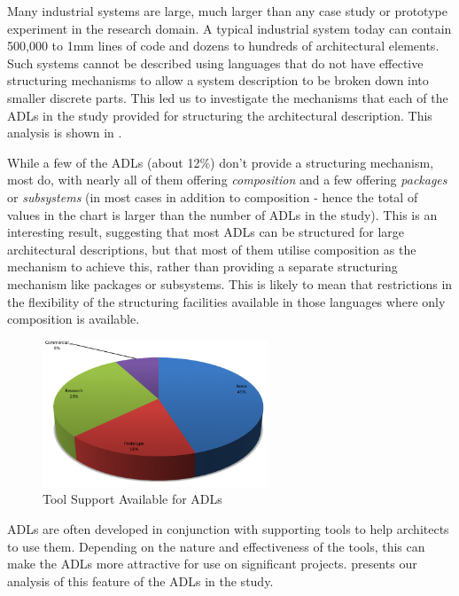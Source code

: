 Many industrial systems are large, much larger than any case study or prototype experiment in the research domain.  A typical industrial system today can contain 500,000 to 1mm lines of code and dozens to hundreds of architectural elements.  Such systems cannot be described using languages that do not have effective structuring mechanisms to allow a system description to be broken down into smaller discrete parts.  This led us to investigate the mechanisms that each of the ADLs in the study provided for structuring the architectural description.  This analysis is shown in .

While a few of the ADLs (about 12\%) don't provide a structuring mechanism, most do, with nearly all of them offering \emph{composition} and a few offering \emph{packages} or \emph{subsystems} (in most cases in addition to composition - hence the total of values in the chart is larger than the number of ADLs in the study).
This is an interesting result, suggesting that most ADLs can be structured for large architectural descriptions, but that most of them utilise composition as the mechanism to achieve this, rather than providing a separate structuring mechanism like packages or subsystems.  This is likely to mean that restrictions in the flexibility of the structuring facilities available in those languages where only composition is available.

\begin{figure}
\centering
\includegraphics[width=0.6\textwidth]{Figures/litreview-adl-toolsupport}
\caption{Tool Support Available for ADLs}
\label{figure:litreview-adl-toolsupport}
\end{figure}

ADLs are often developed in conjunction with supporting tools to help architects to use them.  Depending on the nature and effectiveness of the tools, this can make the ADLs more attractive for use on significant projects.  presents our analysis of this feature of the ADLs in the study.

